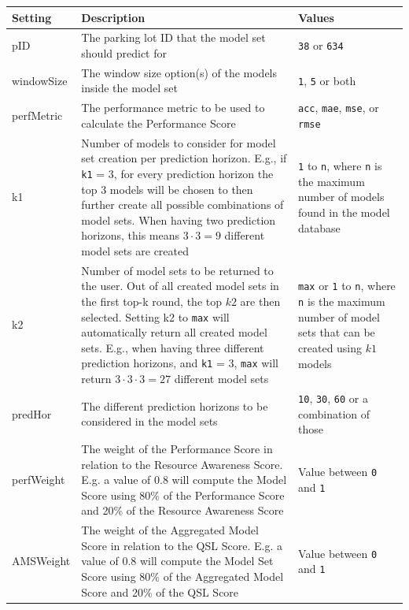 \begin{table}[htbp]
  \centering
      \begin{tabular}{  l  p{7cm}  p{3cm} }
          \toprule
  \textbf{Setting}      
  & \textbf{Description}   
  & \textbf{Values} \\\midrule
  
  pID & The parking lot ID that the model set should predict for & \texttt{38} or \texttt{634} \\\hline
  windowSize & The window size option(s) of the models inside the model set & \texttt{1}, \texttt{5} or both \\\hline
  perfMetric & The performance metric to be used to calculate the Performance Score & \texttt{acc}, \texttt{mae}, \texttt{mse}, or \texttt{rmse} \\\hline
  k1 & Number of models to consider for model set creation per prediction horizon. E.g., if \texttt{k1} = 3, for every prediction horizon the top 3 models will be chosen to then further create all possible combinations of model sets. When having two prediction horizons, this means $3 \cdot 3 = 9$ different model sets are created & \texttt{1} to \texttt{n}, where \texttt{n} is the maximum number of models found in the model database \\\hline
  k2 & Number of model sets to be returned to the user. Out of all created model sets in the first top-k round, the top $k2$ are then selected. Setting k2 to \texttt{max} will automatically return all created model sets. E.g., when having three different prediction horizons, and \texttt{k1} = 3, \texttt{max} will return $3 \cdot 3 \cdot  3 = 27$ different model sets & \texttt{max} or \texttt{1} to \texttt{n}, where \texttt{n} is the maximum number of model sets that can be created using $k1$ models \\\hline
  predHor & The different prediction horizons to be considered in the model sets & \texttt{10}, \texttt{30}, \texttt{60} or a combination of those \\\hline
  perfWeight & The weight of the Performance Score in relation to the Resource Awareness Score. E.g. a value of 0.8 will compute the Model Score using 80\% of the Performance Score and 20\% of the Resource Awareness Score & Value between \texttt{0} and \texttt{1} \\\hline
  AMSWeight & The weight of the Aggregated Model Score in relation to the QSL Score. E.g. a value of 0.8 will compute the Model Set Score using 80\% of the Aggregated Model Score and 20\% of the QSL Score & Value between \texttt{0} and \texttt{1} \\\hline

\end{tabular}
\end{table}

